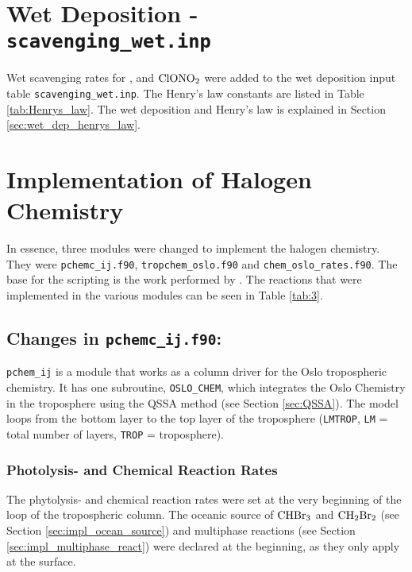 \section{Wet Deposition - \texttt{scavenging\_wet.inp}}\label{sec:scav_wet}

Wet scavenging rates for ,  and $\mathrm{ClONO_2}$ were added to the wet deposition input table \texttt{scavenging\_wet.inp}. The Henry's law constants are listed in Table \ref{tab:Henrys_law}. The wet deposition and Henry's law is explained in Section \ref{sec:wet_dep_henrys_law}. 




\section{Implementation of Halogen Chemistry}

In essence, three modules were changed to implement the halogen chemistry. They were \texttt{pchemc\_ij.f90}, \texttt{tropchem\_oslo.f90} and \texttt{chem\_oslo\_rates.f90}. The base for the scripting is the work performed by \cite{Susanne}. The reactions that were implemented in the various modules can be seen in Table \ref{tab:3}.





\subsection{Changes in \texttt{pchemc\_ij.f90}:}

\texttt{pchem\_ij} is a module that works as a column driver for the Oslo tropospheric chemistry. It has one subroutine, \texttt{OSLO\_CHEM}, which integrates the Oslo Chemistry in the troposphere using the QSSA method (see Section \ref{sec:QSSA}). The model loops from the bottom layer to the top layer of the troposphere (\texttt{LMTROP}, \texttt{LM} = total number of layers, \texttt{TROP} = troposphere). 

\subsubsection{Photolysis- and Chemical Reaction Rates}

The phytolysis- and chemical reaction rates were set at the very beginning of the loop of the tropospheric column. The oceanic source of $\mathrm{CHBr_3}$ and $\mathrm{CH_2Br_2}$ (see Section \ref{sec:impl_ocean_source}) and multiphase reactions (see Section \ref{sec:impl_multiphase_react}) were declared at the beginning, as they only apply at the surface.

